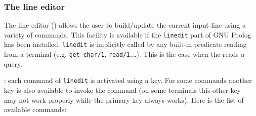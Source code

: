 \subsubsection{The line editor}
\label{The-line-editor}
The line editor () allows the user to build/update the current
input line using a variety of commands. This facility is available if the
\texttt{linedit} part of GNU Prolog has been installed. \texttt{linedit} is
implicitly called by any built-in predicate reading from a terminal (e.g.
\texttt{get\_char/1}, \texttt{read/1},\ldots). This is the case when the
 reads a query.

: each command of \texttt{linedit} is activated using a
key. For some commands another key is also available to invoke the command
(on some terminals this other key may not work properly while the primary
key always works). Here is the list of available commands:

